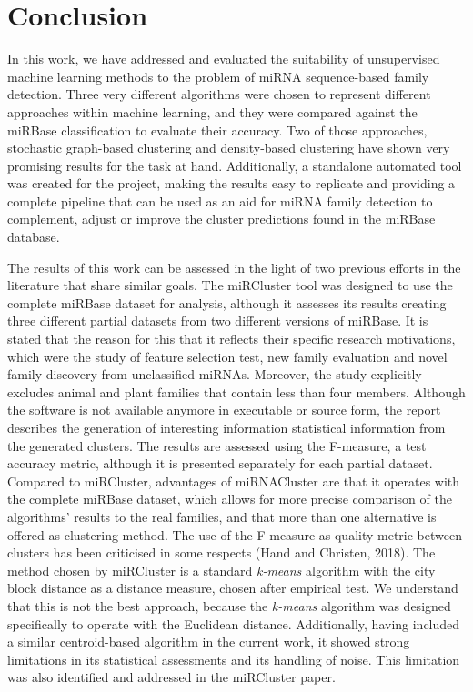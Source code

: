 \documentclass[nocrop]{bioinfo}
\begin{document}
\section{Conclusion}
In this work, we have addressed and evaluated the suitability of unsupervised machine learning methods to the problem of miRNA sequence-based family detection. Three very different algorithms were chosen to represent different approaches within machine learning, and they were compared against the miRBase classification to evaluate their accuracy. Two of those approaches, stochastic graph-based clustering and density-based clustering have shown very promising results for the task at hand. Additionally, a standalone automated tool was created for the project, making the results easy to replicate and providing a complete pipeline that can be used as an aid for miRNA family detection to complement, adjust or improve the cluster predictions found in the miRBase database.

The results of this work can be assessed in the light of two previous efforts in the literature that share similar goals. The miRCluster tool was designed to use the complete miRBase dataset for analysis, although it assesses its results creating three different partial datasets from two different versions of miRBase. It is stated that the reason for this that it reflects their specific research motivations, which were the study of feature selection test, new family evaluation and novel family discovery from unclassified miRNAs. Moreover, the study explicitly excludes animal and plant families that contain less than four members. Although the software is not available anymore in executable or source form, the report describes the generation of interesting information statistical information from the generated clusters. The results are assessed using the F-measure, a test accuracy metric, although it is presented separately for each partial dataset. Compared to miRCluster, advantages of miRNACluster are that it operates with the complete miRBase dataset, which allows for more precise comparison of the algorithms' results to the real families, and that more than one alternative is offered as clustering method. The use of the F-measure as quality metric between clusters has been criticised in some respects (Hand and Christen, 2018). The method chosen by miRCluster is a standard \textit{k-means} algorithm with the city block distance as a distance measure, chosen after empirical test. We understand that this is not the best approach, because the \textit{k-means} algorithm was designed specifically to operate with the Euclidean distance. Additionally, having included a similar centroid-based algorithm in the current work, it showed strong limitations in its statistical assessments and its handling of noise. This limitation was also identified and addressed in the miRCluster paper.
\end{document}

